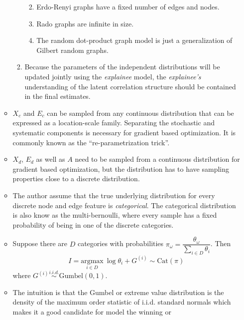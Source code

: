 \documentclass[
  11pt,
  letterpaper,
]{article}
\providecommand{\tightlist}{%
  \setlength{\itemsep}{0pt}\setlength{\parskip}{0pt}}\usepackage{longtable,booktabs,array}
\begin{document}
\begin{itemize}
\begin{itemize}
\begin{enumerate}
      \begin{enumerate}
      \def\labelenumii{\alph{enumii}.}
      \tightlist
      \item
        Erdo-Renyi graphs have a fixed number of edges and nodes.\\
      \item
        Rado graphs are infinite in size.
      \item
        The random dot-product graph model is just a generalization of
        Gilbert random graphs.
      \end{enumerate}
    \item
      Because the parameters of the independent distributions will be
      updated jointly using the \emph{explainee} model, the
      \emph{explainee's} understanding of the latent correlation
      structure should be contained in the final estimates.
    \end{enumerate}
  \item
    \(X_c\) and \(E_c\) can be sampled from any continuous distribution
    that can be expressed as a location-scale family. Separating the
    stochastic and systematic components is necessary for gradient based
    optimization. It is commonly known as the ``re-parametrization
    trick''.
  \item
    \(X_d\), \(E_d\) as well as \(A\) need to be sampled from a
    continuous distribution for gradient based optimization, but the
    distribution has to have sampling properties close to a discrete
    distribution.
  \item
    The author assume that the true underlying distribution for every
    discrete node and edge feature is \emph{categorical}. The
    categorical distribution is also know as the multi-bernoulli, where
    every sample has a fixed probability of being in one of the discrete
    categories.
  \item
    Suppose there are \(D\) categories with probabilities
    \(\pi_\omega = \dfrac{\theta_\omega}{\sum_{i \in D}\theta_i}\). Then
    \begin{equation}
          I = \underset{i \in D}{\text{argmax}} \ \log \theta_i + G^{(i)} 
              \sim \text{Cat}(\pi)
      \end{equation} where
    \(G^{(i)} \overset{i.i.d.}{\sim} \text{Gumbel}(0, 1)\).
  \item
    The intuition is that the Gumbel or extreme value distribution is
    the density of the maximum order statistic of i.i.d. standard
    normals which makes it a good candidate for model the winning or

\end{itemize}
\end{itemize}
\end{document}

